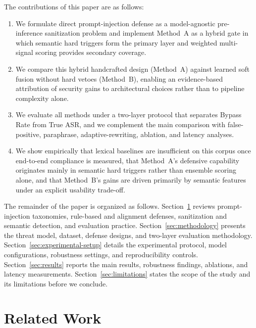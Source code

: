 ﻿\documentclass[10pt]{article}
\begin{document}
The contributions of this paper are as follows:
\begin{enumerate}
  \item We formulate direct prompt-injection defense as a model-agnostic pre-inference sanitization problem and implement Method~A as a hybrid gate in which semantic hard triggers form the primary layer and weighted multi-signal scoring provides secondary coverage.
  \item We compare this hybrid handcrafted design (Method~A) against learned soft fusion without hard vetoes (Method~B), enabling an evidence-based attribution of security gains to architectural choices rather than to pipeline complexity alone.
  \item We evaluate all methods under a two-layer protocol that separates Bypass Rate from True ASR, and we complement the main comparison with false-positive, paraphrase, adaptive-rewriting, ablation, and latency analyses.
  \item We show empirically that lexical baselines are insufficient on this corpus once end-to-end compliance is measured, that Method~A's defensive capability originates mainly in semantic hard triggers rather than ensemble scoring alone, and that Method~B's gains are driven primarily by semantic features under an explicit usability trade-off.
\end{enumerate}

The remainder of the paper is organized as follows.
Section~\ref{sec:related-work} reviews prompt-injection taxonomies, rule-based and alignment defenses, sanitization and semantic detection, and evaluation practice.
Section~\ref{sec:methodology} presents the threat model, dataset, defense designs, and two-layer evaluation methodology.
Section~\ref{sec:experimental-setup} details the experimental protocol, model configurations, robustness settings, and reproducibility controls.
Section~\ref{sec:results} reports the main results, robustness findings, ablations, and latency measurements.
Section~\ref{sec:limitations} states the scope of the study and its limitations before we conclude.



\section{Related Work}
\label{sec:related-work}
\end{document}
